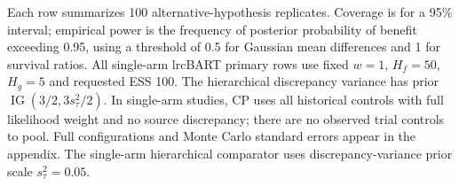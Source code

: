 \noindent\begin{minipage}{\linewidth}\footnotesize Each row summarizes 100 alternative-hypothesis replicates. Coverage is for a 95\% interval; empirical power is the frequency of posterior probability of benefit exceeding 0.95, using a threshold of 0.5 for Gaussian mean differences and 1 for survival ratios. All single-arm lrcBART primary rows use fixed $w=1$, $H_f=50$, $H_g=5$ and requested ESS 100. The hierarchical discrepancy variance has prior $\operatorname{IG}(3/2,3s_\tau^2/2)$. In single-arm studies, CP uses all historical controls with full likelihood weight and no source discrepancy; there are no observed trial controls to pool. Full configurations and Monte Carlo standard errors appear in the appendix. The single-arm hierarchical comparator uses discrepancy-variance prior scale $s_\tau^2=0.05$.\end{minipage}
\endgroup
